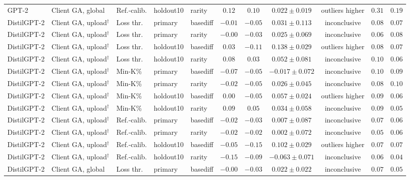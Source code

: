 {\begin{longtable}{@{\extracolsep{\fill}}lllllcccccc@{}}
GPT-2 & Client GA, global & Ref.-calib. & holdout10 & rarity & $0.12$ & $0.10$ & $0.022 \pm 0.019$ & outliers higher & $0.31$ & $0.19$ \\
DistilGPT-2 & Client GA, upload$^{\dagger}$ & Loss thr. & primary & basediff & $-0.01$ & $-0.05$ & $0.031 \pm 0.113$ & inconclusive & $0.08$ & $0.07$ \\
DistilGPT-2 & Client GA, upload$^{\dagger}$ & Loss thr. & primary & rarity & $-0.00$ & $-0.03$ & $0.025 \pm 0.069$ & inconclusive & $0.06$ & $0.08$ \\
DistilGPT-2 & Client GA, upload$^{\dagger}$ & Loss thr. & holdout10 & basediff & $0.03$ & $-0.11$ & $0.138 \pm 0.029$ & outliers higher & $0.08$ & $0.07$ \\
DistilGPT-2 & Client GA, upload$^{\dagger}$ & Loss thr. & holdout10 & rarity & $0.08$ & $0.03$ & $0.052 \pm 0.081$ & inconclusive & $0.10$ & $0.06$ \\
DistilGPT-2 & Client GA, upload$^{\dagger}$ & Min-K\% & primary & basediff & $-0.07$ & $-0.05$ & $-0.017 \pm 0.072$ & inconclusive & $0.10$ & $0.09$ \\
DistilGPT-2 & Client GA, upload$^{\dagger}$ & Min-K\% & primary & rarity & $-0.02$ & $-0.05$ & $0.026 \pm 0.045$ & inconclusive & $0.08$ & $0.10$ \\
DistilGPT-2 & Client GA, upload$^{\dagger}$ & Min-K\% & holdout10 & basediff & $0.00$ & $-0.05$ & $0.057 \pm 0.024$ & outliers higher & $0.09$ & $0.06$ \\
DistilGPT-2 & Client GA, upload$^{\dagger}$ & Min-K\% & holdout10 & rarity & $0.09$ & $0.05$ & $0.034 \pm 0.058$ & inconclusive & $0.09$ & $0.05$ \\
DistilGPT-2 & Client GA, upload$^{\dagger}$ & Ref.-calib. & primary & basediff & $-0.02$ & $-0.03$ & $0.007 \pm 0.087$ & inconclusive & $0.07$ & $0.06$ \\
DistilGPT-2 & Client GA, upload$^{\dagger}$ & Ref.-calib. & primary & rarity & $-0.02$ & $-0.02$ & $0.002 \pm 0.072$ & inconclusive & $0.05$ & $0.06$ \\
DistilGPT-2 & Client GA, upload$^{\dagger}$ & Ref.-calib. & holdout10 & basediff & $-0.05$ & $-0.15$ & $0.102 \pm 0.029$ & outliers higher & $0.07$ & $0.07$ \\
DistilGPT-2 & Client GA, upload$^{\dagger}$ & Ref.-calib. & holdout10 & rarity & $-0.15$ & $-0.09$ & $-0.063 \pm 0.071$ & inconclusive & $0.06$ & $0.04$ \\
DistilGPT-2 & Client GA, global & Loss thr. & primary & basediff & $-0.00$ & $-0.03$ & $0.022 \pm 0.022$ & inconclusive & $0.07$ & $0.05$ \\

\end{longtable}}
